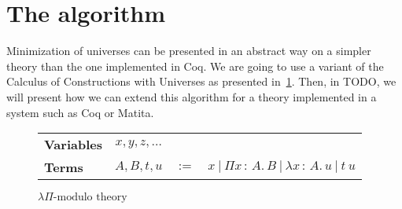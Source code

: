 \documentclass{article}
\newcommand{\lfmt}{\ensuremath{\lambda\Pi\text{-modulo theory}}}
\newcommand{\defn}{\ensuremath{:=}}
\newcommand{\tabs}[3]{\ensuremath{\lambda{#1}\,{:}\,{#2}.\,{#3}}}
\newcommand{\tapp}[2]{\ensuremath{{#1}~{#2}}}
\newcommand{\tpi}[3]{\ensuremath{\Pi{#1}\,{:}\,{#2}.\,{#3}}}
\begin{document}
\section{The algorithm}

Minimization of universes can be presented in an abstract way on a simpler theory than the one implemented in Coq. We are going to use a variant of the Calculus of Constructions with Universes as presented in~\ref{fig:sttsyntax}. Then, in TODO, we will present how we can extend this algorithm for a theory implemented in a system such as Coq or Matita.

\begin{figure}
  \centering
  \begin{tabular}{lccl}
    \textbf{Variables} & \(x,y,z,\dots\) & & \\
    \textbf{Terms} & \(A,B,t,u\) & \(\defn\) & \(x~|~\tpi{x}{A}{B} ~|~\tabs{x}{A}{u} ~|~ \tapp{t}{u} \)\\

  \end{tabular}
  \caption{\lfmt{}}
  \label{fig:sttsyntax}
\end{figure}
\end{document}
